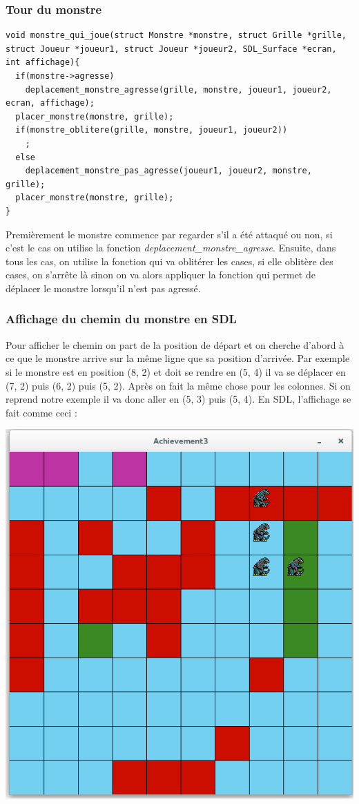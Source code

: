 \subsubsection{Tour du monstre}
\begin{lstlisting}
void monstre_qui_joue(struct Monstre *monstre, struct Grille *grille, struct Joueur *joueur1, struct Joueur *joueur2, SDL_Surface *ecran, int affichage){
  if(monstre->agresse)
    deplacement_monstre_agresse(grille, monstre, joueur1, joueur2, ecran, affichage);
  placer_monstre(monstre, grille);
  if(monstre_oblitere(grille, monstre, joueur1, joueur2))
    ;
  else
    deplacement_monstre_pas_agresse(joueur1, joueur2, monstre, grille);
  placer_monstre(monstre, grille);
}
\end{lstlisting}
Premièrement le monstre commence par regarder s'il a été attaqué ou non, si c'est le cas on utilise la fonction {\textit{deplacement\_monstre\_agresse}}. Ensuite, dans tous les cas, on utilise la fonction qui va oblitérer les cases, si elle oblitère des cases, on s'arrête là sinon on va alors appliquer la fonction qui permet de déplacer le monstre lorsqu'il n'est pas agressé.\\
\subsubsection{Affichage du chemin du monstre en SDL}
Pour afficher le chemin on part de la position de départ et on cherche d'abord à ce que le monstre arrive sur la même ligne que sa position d'arrivée. Par exemple si le monstre est en position (8, 2) et doit se rendre en (5, 4) il va se déplacer en (7, 2) puis (6, 2) puis (5, 2). Après on fait la même chose pour les colonnes. Si on reprend notre exemple il va donc aller en (5, 3) puis (5, 4). En SDL, l'affichage se fait comme ceci :
\begin{center}
\includegraphics[scale=0.4]{./image/chemin_monstre_SDL}
\end{center}
